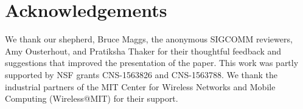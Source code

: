 \section*{Acknowledgements}

We thank our shepherd, Bruce Maggs, the anonymous SIGCOMM reviewers, Amy
Ousterhout, and Pratiksha Thaker for their thoughtful feedback and suggestions
that improved the presentation of the paper. This work was partly supported by
NSF grants CNS-1563826 and CNS-1563788. We thank the industrial partners of the MIT Center for
Wireless Networks and Mobile Computing (Wireless@MIT) for their support.
